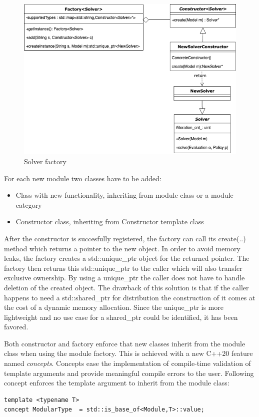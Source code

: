 \begin{figure}[ht]
	\centering
	\includegraphics[width=.6\textwidth]{images/SolverFactory.png}
	\caption{\label{fig:bild2}Solver factory}
	\label{SolverFactory}
\end{figure}

For each new module two classes have to be added:

\begin{itemize}
	\item Class with new functionality, inheriting from module class or a module category
	\item Constructor class, inheriting from Constructor template class
\end{itemize}

After the constructor is succesfully registered, the factory can call its create(..) method which returns a pointer to the new object. In order to avoid memory leaks, the factory creates a std::unique\_ptr object for the returned pointer. The factory then returns this std::unique\_ptr to the caller which will also transfer exclusive ownership. By using a unique\_ptr the caller does not have to handle deletion of the created object. The drawback of this solution is that if the caller happens to need a std::shared\_ptr for distribution the construction of it comes at the cost of a dynamic memory allocation. 
Since the unique\_ptr is more lightweight and no use case for a shared\_ptr could be identified, it has been favored. 

Both constructor and factory enforce that new classes inherit from the module class when using the module factory. This is achieved with a new C++20 feature named \emph{concepts}. Concepts ease the implementation of compile-time validation of template arguments and provide meaningful compile errors to the user. 
Following concept enforces the template argument to inherit from the module class:

\begin{lstlisting}
template <typename T>
concept ModularType  = std::is_base_of<Module,T>::value;
\end{lstlisting}

